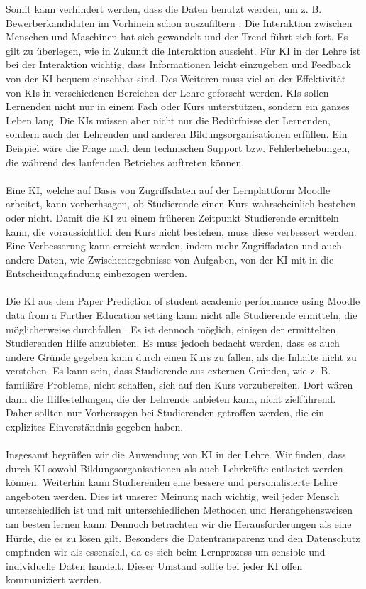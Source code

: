 Somit kann verhindert werden, dass die Daten benutzt werden, um z. B. Bewerberkandidaten im Vorhinein schon auszufiltern \cite[S. 8f]{Pinkwart.2016}.
Die Interaktion zwischen Menschen und Maschinen hat sich gewandelt und der Trend führt sich fort. Es gilt zu überlegen, wie in Zukunft die Interaktion aussieht.
Für KI in der Lehre ist bei der Interaktion wichtig, dass Informationen leicht einzugeben und Feedback von der KI bequem einsehbar sind.
Des Weiteren muss viel an der Effektivität von KIs in verschiedenen Bereichen der Lehre geforscht werden. KIs sollen Lernenden nicht nur in einem Fach oder Kurs unterstützen, sondern ein ganzes Leben lang.
Die KIs müssen aber nicht nur die Bedürfnisse der Lernenden, sondern auch der Lehrenden und anderen Bildungsorganisationen erfüllen.
Ein Beispiel wäre die Frage nach dem technischen Support bzw. Fehlerbehebungen, die während des laufenden Betriebes auftreten können.\cite[S. 10ff]{Pinkwart.2016}
\\
\\ \noindent
Eine KI, welche auf Basis von Zugriffsdaten auf der Lernplattform Moodle arbeitet, kann vorherhsagen, ob Studierende einen Kurs wahrscheinlich bestehen oder nicht.
Damit die KI zu einem früheren Zeitpunkt Studierende ermitteln kann, die voraussichtlich den Kurs nicht bestehen, muss diese verbessert werden.
Eine Verbesserung kann erreicht werden, indem mehr Zugriffsdaten und auch andere Daten, wie Zwischenergebnisse von Aufgaben, von der KI mit in die Entscheidungsfindung einbezogen werden. \cite[S. 14f]{Quinn.2020}
\\ \noindent
\\ \noindent
Die KI aus dem Paper \glqq Prediction of student academic performance using Moodle data from a Further Education setting\grqq{} kann nicht alle Studierende ermitteln, die möglicherweise durchfallen \cite[S. 16]{Quinn.2020}.
Es ist dennoch möglich, einigen der ermittelten Studierenden Hilfe anzubieten. Es muss jedoch bedacht werden, dass es auch andere Gründe gegeben kann durch einen Kurs zu fallen, als die Inhalte nicht zu verstehen.
Es kann sein, dass Studierende aus externen Gründen, wie z. B. familiäre Probleme, nicht schaffen, sich auf den Kurs vorzubereiten.
Dort wären dann die Hilfestellungen, die der Lehrende anbieten kann, nicht zielführend.
Daher sollten nur Vorhersagen bei Studierenden getroffen werden, die ein explizites Einverständnis gegeben haben.
\\
\\
\noindent
Insgesamt begrüßen wir die Anwendung von KI in der Lehre. Wir finden, dass durch KI sowohl Bildungsorganisationen als auch Lehrkräfte entlastet werden können. Weiterhin kann Studierenden eine bessere und personalisierte Lehre angeboten werden. Dies ist unserer Meinung nach wichtig, weil jeder Mensch unterschiedlich ist und mit unterschiedlichen Methoden und Herangehensweisen am besten lernen kann. Dennoch betrachten wir die Herausforderungen als eine Hürde, die es zu lösen gilt. Besonders die Datentransparenz und den Datenschutz empfinden wir als essenziell, da es sich beim Lernprozess um sensible und  individuelle Daten handelt. Dieser Umstand sollte bei jeder KI offen kommuniziert werden.
